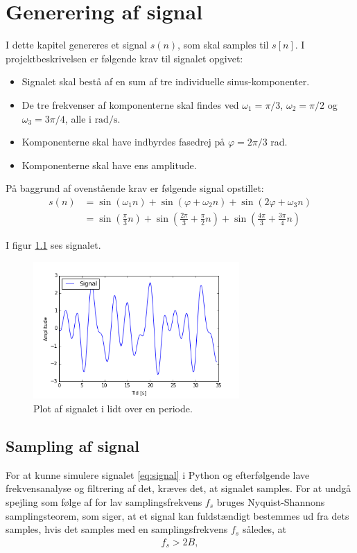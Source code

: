 \chapter{Generering af signal}
I dette kapitel genereres et signal $s(n)$, som skal samples til $s[n]$. I projektbeskrivelsen er følgende krav til signalet opgivet:
\begin{itemize}
\setlength\itemsep{0em}
\item Signalet skal bestå af en sum af tre individuelle sinus-komponenter.
\item De tre frekvenser af komponenterne skal findes ved $\omega_1=\pi/3$, $\omega_2=\pi/2$ og $\omega_3=3\pi/4$, alle i $\text{rad}/\text{s}$.
\item Komponenterne skal have indbyrdes fasedrej på $\varphi=2\pi/3$ rad.
\item Komponenterne skal have ens amplitude.
\end{itemize}

På baggrund af ovenstående krav er følgende signal opstillet:
\begin{align} \label{eq:signal}
s(n)&=\sin\left(\omega_1n\right)+\sin\left(\varphi+\omega_2n\right)+\sin\left(2\varphi+\omega_3n\right)\\
&=\sin\left(\frac{\pi}{3}n\right)+\sin\left(\frac{2\pi}{3}+\frac{\pi}{2}n\right)+\sin\left(\frac{4\pi}{3}+\frac{3\pi}{4}n\right)
\end{align}

I figur \ref{fig:signal} ses signalet.
\begin{figure}[H]
\centering
\includegraphics[width=0.7\textwidth]{figures/signal.png}
\caption{Plot af signalet i lidt over en periode.}
\label{fig:signal}
\end{figure}
\section{Sampling af signal}
For at kunne simulere signalet \eqref{eq:signal} i Python og efterfølgende lave frekvensanalyse og filtrering af det, kræves det, at signalet samples. For at undgå spejling som følge af for lav samplingsfrekvens $f_s$ bruges Nyquist-Shannons samplingsteorem, som siger, at et signal kan fuldstændigt bestemmes ud fra dets samples, hvis det samples med en samplingsfrekvens $f_s$ således, at
\begin{align}
f_s > 2B,
\end{align}

